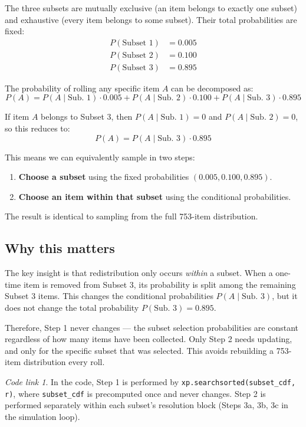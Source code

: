 \documentclass[11pt,a4paper]{article}
\theoremstyle{remark}
\newtheorem*{codelink}{Code link}
\begin{document}
The three subsets are mutually exclusive (an item belongs to exactly one subset) and exhaustive (every item belongs to some subset). Their total probabilities are fixed:
\begin{align*}
P(\text{Subset 1}) &= 0.005 \\
P(\text{Subset 2}) &= 0.100 \\
P(\text{Subset 3}) &= 0.895
\end{align*}

The probability of rolling any specific item $A$ can be decomposed as:
\[
P(A) = P(A \mid \text{Sub.\ 1}) \cdot 0.005 + P(A \mid \text{Sub.\ 2}) \cdot 0.100 + P(A \mid \text{Sub.\ 3}) \cdot 0.895
\]

If item $A$ belongs to Subset 3, then $P(A \mid \text{Sub.\ 1}) = 0$ and $P(A \mid \text{Sub.\ 2}) = 0$, so this reduces to:
\[
P(A) = P(A \mid \text{Sub.\ 3}) \cdot 0.895
\]

This means we can equivalently sample in two steps:
\begin{enumerate}[itemsep=4pt]
\item \textbf{Choose a subset} using the fixed probabilities $(0.005, 0.100, 0.895)$.
\item \textbf{Choose an item within that subset} using the conditional probabilities.
\end{enumerate}

The result is identical to sampling from the full 753-item distribution.

\subsection{Why this matters}

The key insight is that redistribution only occurs \emph{within} a subset. When a one-time item is removed from Subset 3, its probability is split among the remaining Subset 3 items. This changes the conditional probabilities $P(A \mid \text{Sub.\ 3})$, but it does not change the total probability $P(\text{Sub.\ 3}) = 0.895$. 

Therefore, Step 1 never changes --- the subset selection probabilities are constant regardless of how many items have been collected. Only Step 2 needs updating, and only for the specific subset that was selected. This avoids rebuilding a 753-item distribution every roll.

\begin{codelink}
In the code, Step 1 is performed by \texttt{xp.searchsorted(subset\_cdf, r)}, where \texttt{subset\_cdf} is precomputed once and never changes. Step 2 is performed separately within each subset's resolution block (Steps 3a, 3b, 3c in the simulation loop).
\end{codelink}
\end{document}
